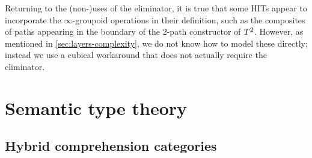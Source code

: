 \documentclass{amsart}
\begin{document}
Returning to the (non-)uses of the eliminator, it is true that some HITs appear to incorporate the $\infty$-groupoid operations in their definition, such as the composites of paths appearing in the boundary of the 2-path constructor of $T^2$.
However, as mentioned in \cref{sec:layers-complexity}, we do not know how to model these directly; instead we use a cubical workaround that does not actually require the eliminator.


\section{Semantic type theory}
\label{sec:semantic-type-theory}

\subsection{Hybrid comprehension categories}
\label{sec:hybrid-ccs}
\end{document}
